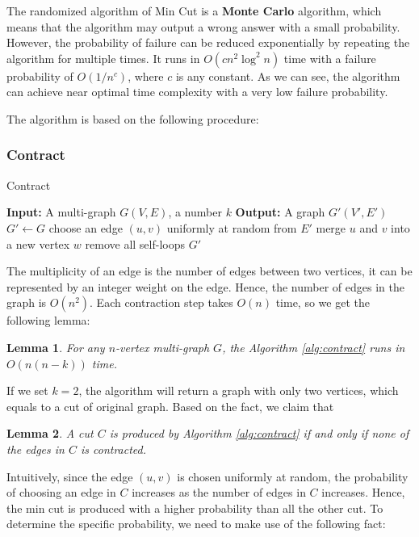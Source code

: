 \documentclass[11pt]{article}
\theoremstyle{plain}
\newtheorem{lemma}{Lemma}[section]
\begin{document}
The randomized algorithm of Min Cut is a \textbf{Monte Carlo} algorithm, which means that the algorithm may output a wrong answer with a small probability. However, the probability of failure can be reduced exponentially by repeating the algorithm for multiple times. It runs in $O(cn^2\log^2 n)$ time with a failure probability of $O(1/n^c)$, where $c$ is any constant. As we can see, the algorithm can achieve near optimal time complexity with a very low failure probability.

The algorithm is based on the following procedure:
\subsubsection{Contract}
\begin{algorithm}
\caption{Contract}
\label{alg:contract}
\begin{algorithmic}[1]
    \STATE \textbf{Input:} A multi-graph $G(V,E)$, a number $k$
    \STATE \textbf{Output:} A graph $G'(V',E')$
    \STATE $G'\leftarrow G$
    \STATE choose an edge $(u,v)$ uniformly at random from $E'$
    \STATE merge $u$ and $v$ into a new vertex $w$
    \STATE remove all self-loops
    \ENDWHILE
    \RETURN $G'$
\end{algorithmic}
\end{algorithm}
The multiplicity of an edge is the number of edges between two vertices, it can be represented by an integer weight on the edge. Hence, the number of edges in the graph is $O(n^2)$. Each contraction step takes $O(n)$ time, so we get the following lemma:

\begin{lemma}
    \label{lemma:9}
    For any $n$-vertex multi-graph $G$, the Algorithm \ref{alg:contract} runs in $O(n(n-k))$ time.
\end{lemma}

If we set $k=2$, the algorithm will return a graph with only two vertices, which equals to a cut of original graph. Based on the fact, we claim that

\begin{lemma}
    \label{lemma:cut}
    A cut $C$ is produced by Algorithm \ref{alg:contract} if and only if none of the edges in $C$ is contracted.
\end{lemma}

Intuitively, since the edge $(u,v)$ is chosen uniformly at random, the probability of choosing an edge in $C$ increases as the number of edges in $C$ increases. Hence, the min cut is produced with a higher probability than all the other cut. To determine the specific probability, we need to make use of the following fact:
\end{document}
